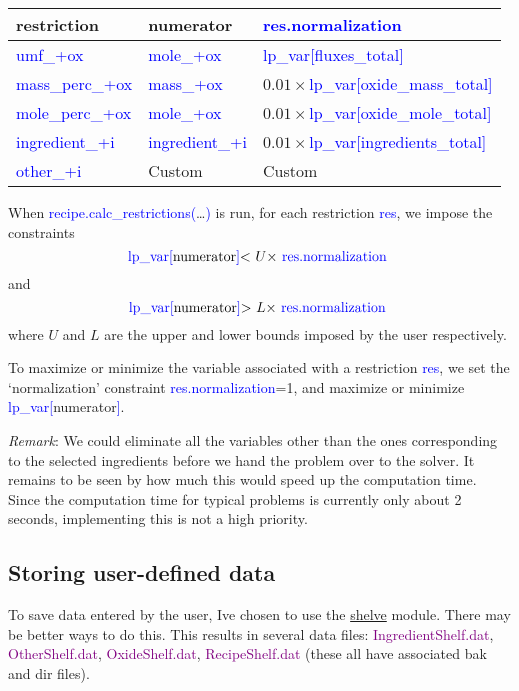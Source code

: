 \documentclass[a4paper,10pt]{article}
\def\'{\textquotesingle}
\def\tq{\textquotesingle}
\def\blue{\textcolor{blue}}
\def\green{\textcolor{Purple}}
\def\lpv{lp\_var}
\begin{document}
\begin{flushleft}
\begin{tabular}{|p{}|p{}| p{}| } \hline
 restriction                   & numerator                     & \blue{res.normalization} \\ \hline
 \blue{\tq umf\_\tq+ox}        & \blue{\tq mole\_\tq+ox} & \blue{\lpv[\tq fluxes\_total\tq]} \\ \hline
 \blue{\tq mass\_perc\_\tq+ox} & \blue{\tq mass\_\tq+ox} & $0.01\times$\blue{\lpv[\tq oxide\_mass\_total\tq]}  \\ \hline
 \blue{\tq mole\_perc\_\tq+ox} & \blue{\tq mole\_\tq+ox} & $0.01\times$\blue{\lpv[\tq oxide\_mole\_total\tq]}  \\ \hline
 \blue{\tq ingredient\_\tq+i}  & \blue{\tq ingredient\_\tq+i} & $0.01\times$\blue{\lpv[\tq ingredients\_total\tq]}  \\ \hline
 \blue{\tq other\_\tq+i}       & Custom &  Custom \\ \hline
\end{tabular}
\end{flushleft}

When \blue{recipe.calc\_restrictions(}\ldots\blue{)} is run, for each restriction \blue{res}, we impose the constraints
$$\textnormal{\blue{\lpv[}numerator\blue{]}< $U\times$ \blue{res.normalization} }$$
and 
$$\textnormal{\blue{\lpv[}numerator\blue{]}> $L\times$ \blue{res.normalization} }$$
where $U$ and $L$ are the upper and lower bounds imposed by the user respectively.

To maximize or minimize the variable associated with a restriction \blue{res}, we set the `normalization' constraint \blue{res.normalization}=1, and maximize or minimize \blue{\lpv[}numerator\blue{]}. 

\emph{Remark}: We could eliminate all the variables other than the ones corresponding to the selected ingredients before we hand the problem over to the solver. It remains to be seen by how much this would speed up the computation time. Since the computation time for typical problems is currently only about 2 seconds, implementing this is not a high priority.

\subsection{Storing user-defined data}

To save data entered by the user, I\'ve chosen to use the \href{https://docs.python.org/3.6/library/shelve.html}{shelve} module. There may be better ways to do this. This results in several data files: \green{IngredientShelf.dat}, \green{OtherShelf.dat}, \green{OxideShelf.dat}, \green{RecipeShelf.dat} (these all have associated bak and dir files). 
\end{document}

